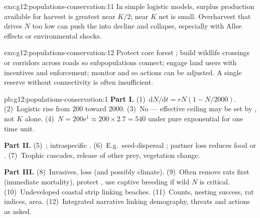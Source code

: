 \begin{solution}{exo:g12:populations-conservation:11}
In simple logistic models, surplus production available for harvest is
greatest near $K/2$; near $K$ net  is small. Overharvest that drives $N$
too low can push the  into decline and collapse, especially with
Allee effects or environmental shocks.
\end{solution}

\begin{solution}{exo:g12:populations-conservation:12}
Protect core forest ; build wildlife crossings or corridors across
roads so subpopulations connect; engage land users with incentives and
enforcement; monitor  and  so actions can be adjusted. A
single reserve without connectivity is often insufficient.
\end{solution}

\begin{solution}{pb:g12:populations-conservation:1}
\textbf{Part I.} (1)~$\mathrm{d}N/\mathrm{d}t=rN(1-N/2000)$.
(2)~Logistic rise from $200$ toward $2000$. (3)~No --- effective ceiling may
be set by , not  $K$ alone. (4)~$N=200\mathrm{e}^{1}
\approx 200\times 2.7=540$ under pure exponential for one time unit.

\textbf{Part II.} (5)~; intraspecific .
(6)~E.g.\ seed-dispersal ; partner loss reduces food or .
(7)~Trophic cascades, release of other prey, vegetation change.

\textbf{Part III.} (8)~Invasives,  loss (and possibly climate).
(9)~Often remove rats first (immediate mortality), protect , use
captive breeding if wild $N$ is critical. (10)~Undeveloped coastal strip
linking beaches. (11)~Counts, nesting success, rat indices,  area.
(12)~Integrated narrative linking demography, threats and actions as asked.
\end{solution}
